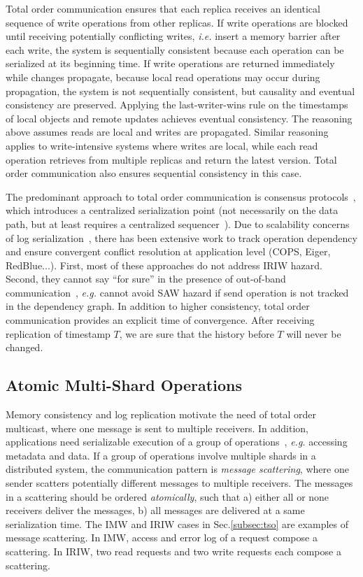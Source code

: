 Total order communication ensures that each replica receives an identical sequence of write operations from other replicas. If write operations are blocked until receiving potentially conflicting writes, \textit{i.e.} insert a memory barrier after each write, the system is sequentially consistent because each operation can be serialized at its beginning time. If write operations are returned immediately while changes propagate, because local read operations may occur during propagation, the system is not sequentially consistent, but causality and eventual consistency are preserved. Applying the last-writer-wins rule  on the timestamps of local objects and remote updates achieves eventual consistency. The reasoning above assumes reads are local and writes are propagated. Similar reasoning applies to write-intensive systems where writes are local, while each read operation retrieves from multiple replicas and return the latest version. Total order communication also ensures sequential consistency in this case.

The predominant approach to total order communication is consensus protocols~\cite{lamport1998part,raft}, which introduces a centralized serialization point (not necessarily on the data path, but at least requires a centralized sequencer~\cite{kaminsky2016design}). Due to scalability concerns of log serialization~\cite{anna}, there has been extensive work to track operation dependency and ensure convergent conflict resolution at application level (COPS, Eiger, RedBlue...). First, most of these approaches do not address IRIW hazard. Second, they cannot say ``for sure'' in the presence of out-of-band communication~\cite{cheriton1994understanding}, \textit{e.g.} cannot avoid SAW hazard if send operation is not tracked in the dependency graph. In addition to higher consistency, total order communication provides an explicit time of convergence. After receiving replication of timestamp $T$, we are sure that the history before $T$ will never be changed.

\subsection{Atomic Multi-Shard Operations}
\label{subsec:transactional-kvs}

Memory consistency and log replication motivate the need of total order multicast, where one message is sent to multiple receivers. In addition, applications need serializable execution of a group of operations~\cite{cheriton1994understanding}, \textit{e.g.} accessing metadata and data. If a group of operations involve multiple shards in a distributed system, the communication pattern is \textit{message scattering}, where one sender scatters potentially different messages to multiple receivers. The messages in a scattering should be ordered \textit{atomically}, such that a) either all or none receivers deliver the messages, b) all messages are delivered at a same serialization time. The IMW and IRIW cases in Sec.\ref{subsec:tso} are examples of message scattering. In IMW, access and error log of a request compose a scattering. In IRIW, two read requests and two write requests each compose a scattering.


